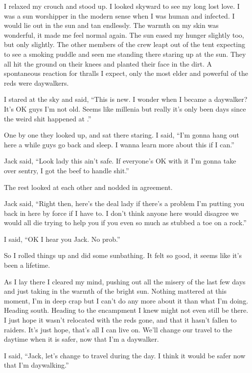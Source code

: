 I relaxed my crouch and stood up. I looked skyward to see my long lost love. I was a sun worshipper in the  modern sense when I was human and infected. I would lie out in the sun and tan endlessly. The warmth on my skin was wonderful, it made me feel normal again. The sun eased my hunger slightly too, but only slightly. The other members of the crew leapt out of the tent expecting to see a smoking puddle and seen me standing there staring up at the sun. They all hit the ground on their knees and planted their face in the dirt. A spontaneous reaction for thralls I expect, only the most elder and powerful of the reds were daywalkers.

I stared at the sky and said, ``This is new. I wonder when I became a daywalker? It's OK guys I'm not old. Seems like millenia but really it's only been days since the weird shit happened at \chichenitza*.''

One by one they looked up, and sat there staring. I said, ``I'm gonna hang out here a while guys go back and sleep. I wanna learn more about this if I can.''

Jack said, ``Look lady this ain't safe. If everyone's OK with it I'm gonna take over sentry, I got the beef to handle shit.''

The rest looked at each other and nodded in agreement.

Jack said, ``Right then, here's the deal lady if there's a problem I'm putting you back in here by force if I have to. I don't think anyone here would disagree we would all die trying to help you if you even so much as stubbed a toe on a rock.''

I said, ``OK I hear you Jack. No prob.''

So I rolled things up and did some sunbathing. It felt so good, it seems like it's been a lifetime.


As I lay there I cleared my mind, pushing out all the misery of the last few days and just taking in the warmth of the bright sun. Nothing mattered at this moment, I'm in deep crap but I can't do any more about it than what I'm doing. Heading south. Heading to the encampment I knew might not even still be there. I just hope it wasn't relocated with the reds gone, and that it hasn't fallen to raiders. It's just hope, that's all I can live on. 
We'll change our travel to the daytime when it is safer, now that I'm a daywalker. 

I said, ``Jack, let's change to travel during the day. I think it would be safer now that I'm daywalking.''

